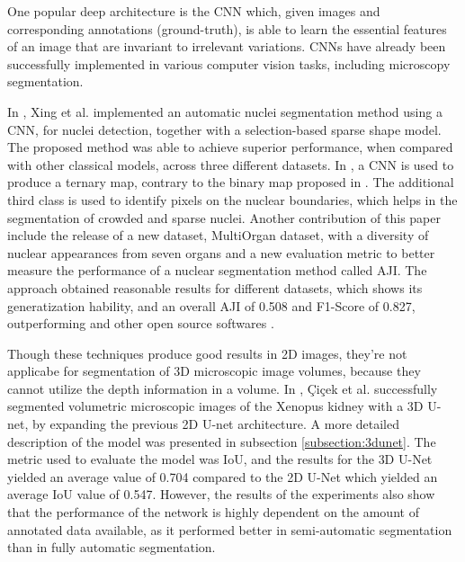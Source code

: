 One popular deep architecture is the \ac{CNN} which, given images and corresponding annotations (ground-truth), is able to learn the essential features of an image that are invariant to irrelevant variations. \ac{CNNs} have already been successfully implemented in various computer vision tasks, including microscopy segmentation.

In \cite{CNN2}, Xing et al. implemented an automatic nuclei segmentation method using a \ac{CNN}, for nuclei detection, together with a selection-based sparse shape model. The proposed method was able to achieve superior performance, when compared with other classical models, across three different datasets. In \cite{CNN3}, a \ac{CNN} is used to produce a ternary map, contrary to the binary map proposed in \cite{CNN2}. The additional third class is used to identify pixels on the nuclear boundaries, which helps in the segmentation of crowded and sparse nuclei. Another contribution of this paper include the release of a new dataset, MultiOrgan dataset, with a diversity of nuclear appearances from seven organs and a new evaluation metric to better measure the performance of a nuclear segmentation method called \ac{AJI}. The approach obtained reasonable results for different datasets, which shows its generatization hability, and an overall \ac{AJI} of 0.508 and F1-Score of  0.827, outperforming \cite{CNN2} and other open source softwares \cite{cellprofiler}. 

Though these techniques produce good results in \ac{2D} images, they're not applicabe for segmentation of \ac{3D} microscopic image volumes, because they cannot utilize the depth information in a volume. In \cite{Unet:3D}, Çiçek et al. successfully segmented volumetric microscopic images of the Xenopus kidney with a \ac{3D} U-net, by expanding the previous \ac{2D} U-net \cite{Unet:2D} architecture. A more detailed description of the model was presented in subsection \ref{subsection:3dunet}. The metric used to evaluate the model was \ac{IoU}, and the results for the \ac{3D} U-Net yielded an average value of 0.704 compared to the \ac{2D} U-Net which yielded an average \ac{IoU} value of 0.547. However, the results of the experiments also show that the performance of the network is highly dependent on the amount of annotated data available, as it performed better in semi-automatic segmentation than in fully automatic segmentation.


